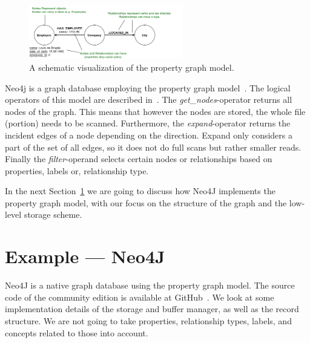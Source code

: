         \begin{figure}[htp]
            \begin{center}
                \includegraphics[keepaspectratio,width=0.6\textwidth]{img/04-databases/property_graph_elements.png}
            \end{center}
            \caption{A schematic visualization of the property graph model.} 
            \label{propertygraph}
        \end{figure}

        
        Neo4j is a graph database employing the property graph model~\cite{robinson2015graph}.
        The logical operators of this model are described in~\autocite{Holsch2016Algeb}. 
        The \textit{get\_nodes}-operator returns all nodes of the graph.
        This means that however the nodes are stored, the whole file (portion) needs to be scanned.
        Furthermore, the \textit{expand}-operator returns the incident edges of a node depending on the direction.
        Expand only considers a part of the set of all edges, so it does not do full scans but rather smaller reads.
        Finally the \textit{filter}-operand selects certain nodes or relationships based on properties, labels or, relationship type.
        
        In the next Section~\ref{n4j} we are going to discuss how Neo4J implements the property graph model, with our focus on the structure of the graph and the low-level storage scheme.

\section{Example --- Neo4J}\label{n4j}
    Neo4J is a native graph database using the property graph model.
    The source code of the community edition is available at GitHub~\autocite{GitHubneo4j}.
    We look at some implementation details of the storage and buffer manager, as well as the record structure.
    We are not going to take properties, relationship types, labels, and concepts related to those into account.
    
